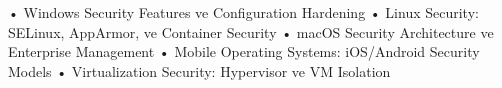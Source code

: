 • Windows Security Features ve Configuration Hardening
• Linux Security: SELinux, AppArmor, ve Container Security
• macOS Security Architecture ve Enterprise Management
• Mobile Operating Systems: iOS/Android Security Models
• Virtualization Security: Hypervisor ve VM Isolation
